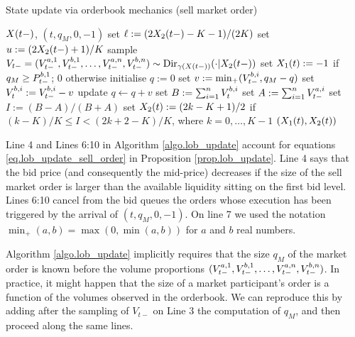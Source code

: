 \documentclass[10pt, article,table]{article}
\begin{document}
\begin{algorithm}[h]
 \caption{State update via orderbook mechanics (sell market order)}
 \label{algo.lob_update}
 \begin{algorithmic}[5]
  \REQUIRE $\stateVariable(t-)$, $(t,q_M, 0, -1)$
  \STATE set $\ell := (2\stateVariable_2(t-) - K - 1)/(2K)$
  \STATE set $u:= (2\stateVariable_2(t-) +1)/K$
  \STATE sample $V_{t-} = (\nthBestAskVolume[1]_{t-},\nthBestBidVolume[1]_{t-},\dots,\nthBestAskVolume[n]_{t-},\nthBestBidVolume[n]_{t-}) \sim \text{Dir}_{\dirichletParam(\stateVariable(t-))}(\cdot \vert \stateVariable_2 (t-) )$ 
  \STATE set $\stateVariable_1(t) := -1$ if $q_M \geq \nthBestBidPrice[1]_{t-}$; $0$ otherwise
  \STATE initialise $q:=0$
  \STATE set $v:= \min_{+} (\nthBestBidVolume[i]_{t-}, q_M - q )$
  \STATE set $\nthBestBidVolume[i]_{t} := \nthBestBidVolume[i]_{t-} - v$
  \STATE update $q\leftarrow q+v$
  \ENDFOR
  \STATE set $B:= \sum_{i=1}^{n} \nthBestBidVolume[i]_t$
  \STATE set $A:= \sum_{i=1}^{n} \nthBestAskVolume[i]_{t-}$
  \STATE set $I:= (B-A)/(B+A)$ 
  \STATE set $\stateVariable_2(t):= (2k-K+1)/2$ if $(k-K)/K \leq I < (2k+2 -K)/K$, where $k=0,\dots,K-1$
  \RETURN $(\stateVariable_1(t),\stateVariable_2(t))$
 \end{algorithmic}
\end{algorithm}

Line 4 and Lines 6:10 in Algorithm \ref{algo.lob_update} account for equations \eqref{eq.lob_update_sell_order} in Proposition \ref{prop.lob_update}. Line 4 says that the bid price (and consequently the mid-price) decreases if the size of the sell market order is larger than the available liquidity sitting on the first bid level. Lines 6:10 cancel from the bid queues the orders whose execution has been triggered by the arrival of $(t,q_M,0,-1)$.  On line 7 we used the notation $\min_{+}(a,b) = \max(0,\min(a,b))$ for $a$ and $b$ real numbers. 

\begin{remark}\label{remark.order_size_after_volume_sampling}
 Algorithm \ref{algo.lob_update} implicitly requires that the size $q_M$ of the market order is known before the volume proportions $(\nthBestAskVolume[1]_{t-},\nthBestBidVolume[1]_{t-},\dots,\nthBestAskVolume[n]_{t-},\nthBestBidVolume[n]_{t-})$. In practice, it might happen that the size of a market participant's order is a function of the volumes observed in the orderbook. We can reproduce this by adding after the sampling of $V_{t-}$ on Line 3 the computation of $q_M$, and then proceed along the same lines.
\end{remark}
\end{document}
